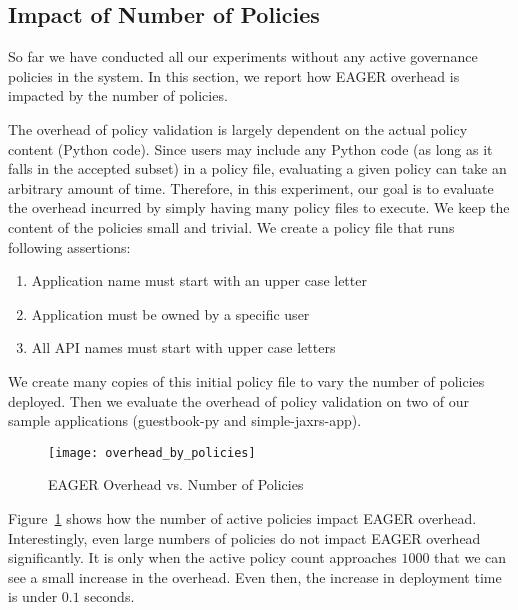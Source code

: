 \subsection{Impact of Number of Policies}

So far we have conducted all our experiments without any active governance 
policies in the system. In this section, we report how EAGER overhead
is impacted by the number of policies.

The overhead of policy validation is largely dependent on the actual policy
content (Python code). Since users may include any Python code 
(as long as it falls in the accepted subset) in a policy file, evaluating a
given policy can take an arbitrary amount of time.  Therefore, in this
experiment, our goal is to evaluate the overhead incurred by simply having
many policy files to execute. We keep the content of the policies small and
trivial. We create a policy file that runs following assertions:
\begin{enumerate} 
\vspace{0.05in}
\item Application name must start with an upper case letter
\vspace{0.05in}
\item Application must be owned by a specific user 
\vspace{0.05in}
\item All API names must start with upper case letters 
\vspace{0.05in}
\end{enumerate} We create many copies of this
initial policy file to vary the number of policies deployed. Then we evaluate
the overhead of policy validation on two of our sample applications
(guestbook-py and simple-jaxrs-app). 

\begin{figure}
\centering
\texttt{[image: overhead\_by\_policies]}
\caption{EAGER Overhead vs. Number of Policies}
\label{fig:overhead_by_policies}
\end{figure}

Figure~\ref{fig:overhead_by_policies} shows how the number of active policies
impact EAGER overhead. Interestingly, even large numbers of policies 
do not impact EAGER overhead significantly. It is only when the active
policy count approaches $1000$ that we can see a small increase in the
overhead. Even then, the increase in deployment time is under $0.1$ seconds. 

